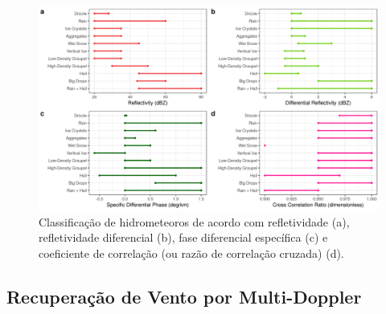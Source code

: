 \begin{figure}[htb]
	\begin{center}
		\caption{Classificação de hidrometeoros de acordo com refletividade (a), refletividade diferencial (b), fase diferencial específica (c) e coeficiente de correlação (ou razão de correlação cruzada) (d).} 
		\label{hid_straka}
		\includegraphics[width=\columnwidth]{../General_Processing/figures/hids_strakaetal.png}
	\end{center}
\end{figure}


\subsection{Recuperação de Vento por Multi-Doppler}\label{multidoppler}

